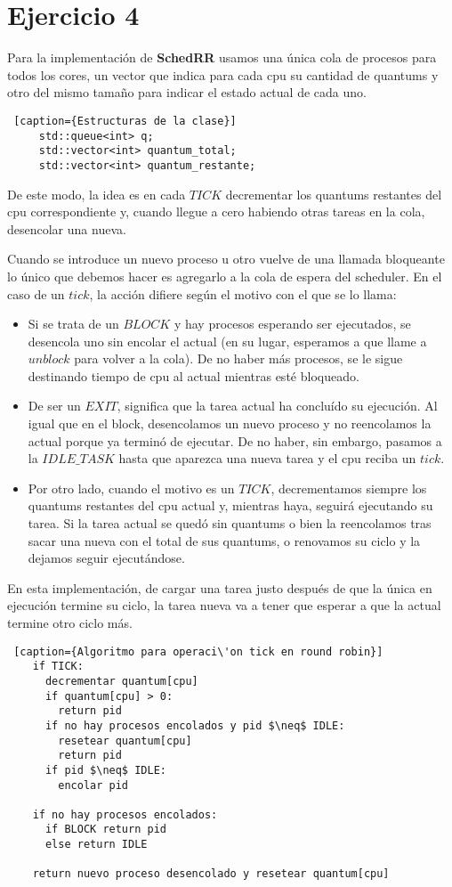 \section{Ejercicio 4}

\label{sec:rr}

Para la implementación de \textbf{SchedRR} usamos una única cola de procesos para todos los cores, un vector que indica para cada cpu su cantidad de quantums y otro del mismo tamaño para indicar el estado actual de cada uno.
  \begin{lstlisting} [caption={Estructuras de la clase}]
     std::queue<int> q;
     std::vector<int> quantum_total;
     std::vector<int> quantum_restante;
  \end{lstlisting}

De este modo, la idea es en cada $TICK$ decrementar los quantums restantes del cpu correspondiente y, cuando llegue a cero habiendo otras tareas en la cola, desencolar una nueva.

Cuando se introduce un nuevo proceso u otro vuelve de una llamada bloqueante lo único que debemos hacer es agregarlo a la cola de espera del scheduler.
En el caso de un $tick$, la acción difiere según el motivo con el que se lo llama:

  \begin{itemize}
    \item Si se trata de un $BLOCK$ y hay procesos esperando ser ejecutados, se desencola uno sin encolar el actual (en su lugar, esperamos a que llame a $unblock$ para volver a la cola). De no haber más procesos, se le sigue destinando tiempo de cpu al actual mientras esté bloqueado.
    \item De ser un $EXIT$, significa que la tarea actual ha concluído su ejecución. Al igual que en el block, desencolamos un nuevo proceso y no reencolamos la actual porque ya terminó de ejecutar. De no haber, sin embargo, pasamos a la $IDLE\_TASK$ hasta que aparezca una nueva tarea y el cpu reciba un $tick$.
    \item Por otro lado, cuando el motivo es un $TICK$, decrementamos siempre los quantums restantes del cpu actual y, mientras haya, seguirá ejecutando su tarea. Si la tarea actual se quedó sin quantums o bien la reencolamos tras sacar una nueva con el total de sus quantums, o renovamos su ciclo y la dejamos seguir ejecutándose.
  \end{itemize}

En esta implementación, de cargar una tarea justo después de que la única en ejecución termine su ciclo, la tarea nueva va a tener que esperar a que la actual termine otro ciclo más.

  \begin{lstlisting} [caption={Algoritmo para operaci\'on tick en round robin}]
    if TICK:
      decrementar quantum[cpu]
      if quantum[cpu] > 0:
        return pid
      if no hay procesos encolados y pid $\neq$ IDLE:
        resetear quantum[cpu]
        return pid
      if pid $\neq$ IDLE:
        encolar pid

    if no hay procesos encolados:
      if BLOCK return pid
      else return IDLE

    return nuevo proceso desencolado y resetear quantum[cpu]
  \end{lstlisting}
